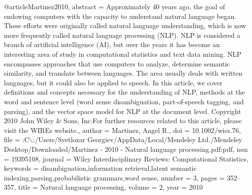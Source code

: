@article{Martinez2010,
      abstract = {Approximately 40 years ago, the goal of endowing computers with the capacity to understand natural language began. These efforts were originally called natural language understanding, which is now more frequently called natural language processing (NLP). NLP is considered a branch of artificial intelligence (AI), but over the years it has become an interesting area of study in computational statistics and text data mining. NLP encompasses approaches that use computers to analyze, determine semantic similarity, and translate between languages. The area usually deals with written languages, but it could also be applied to speech. In this article, we cover definitions and concepts necessary for the understanding of NLP, methods at the word and sentence level (word sense disambiguation, part-of-speech tagging, and parsing), and the vector space model for NLP at the document level. Copyright {\textcopyright} 2010 John Wiley {\&} Sons, Inc.For further resources related to this article, please visit the WIREs website.},
      author = {Martinez, Angel R.},
      doi = {10.1002/wics.76},
      file = {:C$\backslash$:/Users/Svetlozar Georgiev/AppData/Local/Mendeley Ltd./Mendeley Desktop/Downloaded/Martinez - 2010 - Natural language processing.pdf:pdf},
      issn = {19395108},
      journal = {Wiley Interdisciplinary Reviews: Computational Statistics},
      keywords = {disambiguation,information retrieval,latent semantic indexing,parsing,probabilistic grammars,word sense},
      number = {3},
      pages = {352--357},
      title = {{Natural language processing}},
      volume = {2},
      year = {2010}
}
